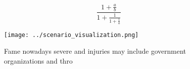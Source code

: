 \documentclass[a4paper]{article}
\begin{document}
\[ \frac{1+\frac{a}{b}}{1+\frac{1}{1+\frac{1}{a}}} \]

\begin{figure}
\centering
\texttt{[image: ../scenario\_visualization.png]}
\caption{Fame nowadays severe and injuries may include government organizations and thro
}
\end{figure}
 
\end{document}
